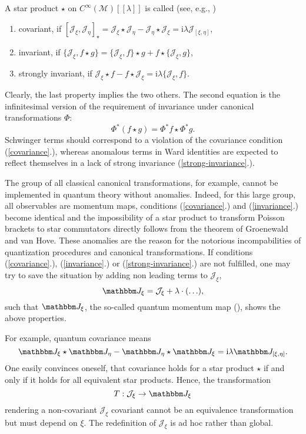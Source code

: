 \documentclass[a4paper,12pt]{article}
\begin{document}
A star product $\star$ on $C^\infty(\mathcal M)[[\lambda]]$ is called (see,
e.g., \cite{ACMP83})
\begin{enumerate}
\item \label{covariance}
covariant, if 
$[\mathcal J_\xi,\mathcal J_\eta]_\star=
\mathcal J_\xi\star\mathcal J_\eta
-\mathcal J_\eta\star\mathcal J_\xi=\textrm{i}\lambda\mathcal J_{[\xi,\eta]}$,
\item \label{invariance}
invariant, if
$\{\mathcal J_\xi,f\star g\}=\{\mathcal J_\xi,f\}\star g
+f\star\{\mathcal J_\xi,g\}$,
\item \label{strong-invariance}
strongly invariant, if
$\mathcal J_\xi\star f- f\star\mathcal J_\xi=\textrm{i}\lambda\{\mathcal J_\xi,f\}$.
\end{enumerate}
Clearly, the last property implies the two others. The second equation is the
infinitesimal version of the requirement of invariance under canonical
transformations $\Phi$:
\[
\Phi^\ast(f\star g)=\Phi^\ast f\star \Phi^\ast g.
\]
Schwinger terms should correspond to a violation of the covariance condition
(\ref{covariance}.), whereas anomalous terms in Ward identities are expected to
reflect 
themselves in a lack of strong invariance (\ref{strong-invariance}.).

The group of all classical canonical transformations, for example, cannot be
implemented in quantum theory without anomalies. Indeed, for this large group,
all observables are momentum maps, conditions (\ref{covariance}.) and
(\ref{invariance}.) become identical and  
the impossibility of a star product to transform Poisson brackets to star
commutators directly follows from the theorem of Groenewald and van Hove. These
anomalies are the reason for the notorious incompabilities of quantization
procedures and canonical transformations. If conditions (\ref{covariance}.),
(\ref{invariance}.) or (\ref{strong-invariance}.) are not fulfilled, one may try
to save the situation by adding non leading terms to $\mathcal J_\xi$,
\[
\mathbbm J_\xi=\mathcal J_\xi+\lambda\cdot(\ldots),
\]
such that $\mathbbm J_\xi$, the so-called quantum momentum map (\cite{Xu98}),
shows the above properties. 

For example, quantum covariance means
\[
\mathbbm J_\xi\star\mathbbm J_\eta-\mathbbm J_\eta\star\mathbbm J_\xi
=\textrm{i}\lambda\mathbbm J_{[\xi,\eta]}.
\]
One easily convinces oneself, that covariance holds for a star product $\star$
if and only if it holds for all equivalent star products. Hence, the
transformation 
\[
T:\mathcal J_\xi\rightarrow\mathbbm J_\xi
\]
rendering a non-covariant $\mathcal J_\xi$ covariant cannot be an equivalence
transformation but must depend on $\xi$. The redefinition of $\mathcal J_\xi$ is 
ad hoc rather than global.
\end{document}
